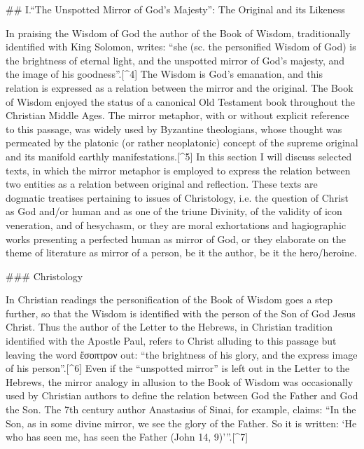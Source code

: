 ## I.“The Unspotted Mirror of God's Majesty”: The Original and its Likeness

In praising the Wisdom of God the author of the Book of Wisdom, traditionally identified with King Solomon, writes: “she (sc. the personified Wisdom of God) is the brightness of eternal light, and the unspotted mirror of God's majesty, and the image of his goodness”.[^4] The Wisdom is God’s emanation, and this relation is expressed as a relation between the mirror and the original. The Book of Wisdom enjoyed the status of a canonical Old Testament book throughout the Christian Middle Ages. The mirror metaphor, with or without explicit reference to this passage, was widely used by Byzantine theologians, whose thought was permeated by the platonic (or rather neoplatonic) concept of the supreme original and its manifold earthly manifestations.[^5] In this section I will discuss selected texts, in which the mirror metaphor is employed to express the relation between two entities as a relation between original and reflection. These texts are dogmatic treatises pertaining to issues of Christology, i.e. the question of Christ as God and/or human and as one of the triune Divinity, of the validity of icon veneration, and of hesychasm, or they are moral exhortations and hagiographic works presenting a perfected human as mirror of God, or they elaborate on the theme of literature as mirror of a person, be it the author, be it the hero/heroine.

### Christology

In Christian readings the personification of the Book of Wisdom goes a step further, so that the Wisdom is identified with the person of the Son of God Jesus Christ. Thus the author of the Letter to the Hebrews, in Christian tradition identified with the Apostle Paul, refers to Christ alluding to this passage but leaving the word ἔσοπτρον out: “the brightness of his glory, and the express image of his person”.[^6] Even if the “unspotted mirror” is left out in the Letter to the Hebrews, the mirror analogy in allusion to the Book of Wisdom was occasionally used by Christian authors to define the relation between God the Father and God the Son. The 7th century author Anastasius of Sinai, for example, claims: “In the Son, as in some divine mirror, we see the glory of the Father. So it is written: ‘He who has seen me, has seen the Father (John 14, 9)’”.[^7]

